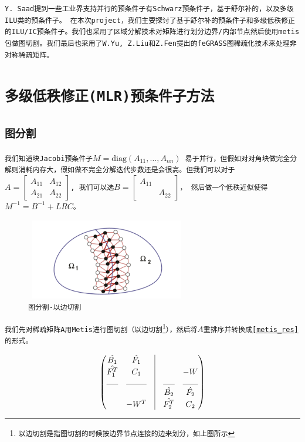 \documentclass[11pt, a4paper]{article}
\theoremstyle{plain}
\theoremstyle{plain}
\theoremstyle{plain}
\theoremstyle{definition}
\theoremstyle{remark}
\theoremstyle{definition}
\newcommand{\T}[1]{\texttt{#1}}
\begin{document}
\T{Y. Saad\cite{Course}提到}\T{一些工业界支持并行的预条件子有Schwarz预条件子，基于舒尔补的，以及多级ILU类的预条件子。 在本次project，我们主要探讨了基于舒尔补的预条件子和多级低秩修正的ILU/IC预条件子。}\T{我们也采用了区域分解技术}\cite{MLR}\T{对矩阵进行划分边界/内部节点然后使用metis包做图切割。我们最后也采用了W.Yu, Z.Liu和Z.Fen提出的feGRASS图稀疏化技术\cite{Sparse}来处理非对称稀疏矩阵。}

\section{\T{多级低秩修正(MLR)预条件子方法}}
\subsection{\T{图分割}}
\T{我们知道块Jacobi预条件子$M = \text{diag}(A_{11}, \ldots, A_{nn})$ 易于并行，但假如对对角块做完全分解则消耗内存大，假如做不完全分解迭代步数还是会很高。但我们可以对于$A = \begin{bmatrix} A_{11} & A_{12} \\ A_{21} & A_{22} \end{bmatrix}$, 我们可以选$B = \begin{bmatrix} A_{11} & \\ & A_{22} \end{bmatrix}$， 然后做一个低秩近似使得 $M^{-1} = B^{-1}+LRC$。
}


\begin{figure}[H]
	\label{domain}
	\caption{\T{图分割-以边切割\cite{MLR}}}
	\centering
	\includegraphics[width=200pt,height=100pt]{graph.png}
\end{figure}

\T{我们先对稀疏矩阵A用Metis\cite{Metis}进行图切割（以边切割\footnote{以边切割是指图切割的时候按边界节点连接的边来划分，如上图所示}），然后将$A$重排序并转换成\eqref{metis_res}的形式\cite{MLR}。}

\begin{equation}
	\label{metis_res}
	\begin{pmatrix}
		\hat{B_{1}} & \hat{F_{1}} & \vline & & \\
		\hat{F_{1}^T} & C_1 & \vline & & -W \\
		\hrulefill & \hrulefill & \vline & \hrulefill & \hrulefill \\
		& & \vline & \hat{B_{2}} & \hat{F_{2}} \\
		& -W^T & \vline & \hat{F_{2}^T} & C_2
	\end{pmatrix}
\end{equation}
\end{document}
